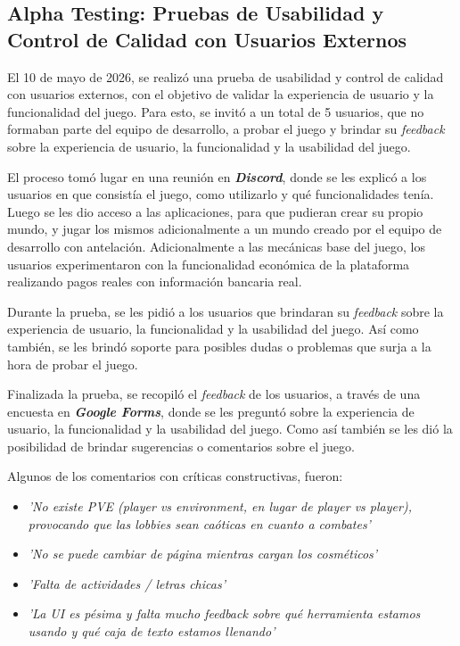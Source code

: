 \subsection{Alpha Testing: Pruebas de Usabilidad y Control de Calidad con Usuarios Externos}

El 10 de mayo de 2026, se realizó una prueba de usabilidad y control de calidad con usuarios externos, con el 
objetivo de validar la experiencia de usuario y la funcionalidad del juego. Para esto, se invitó a un total de 5 usuarios, 
que no formaban parte del equipo de desarrollo, a probar el juego y brindar su \textit{feedback} sobre la experiencia de 
usuario, la funcionalidad y la usabilidad del juego.
\vspace{0.25cm}

El proceso tomó lugar en una reunión en \textit{\textbf{Discord}}, donde se les explicó a los usuarios en que
consistía el juego, como utilizarlo y qué funcionalidades tenía. Luego se les dio acceso a las aplicaciones, para que pudieran crear su propio mundo,
y jugar los mismos adicionalmente a un mundo creado por el equipo de desarrollo con antelación.
Adicionalmente a las mecánicas base del juego, los usuarios experimentaron con la funcionalidad económica de la plataforma realizando pagos reales con
información bancaria real.
\vspace{0.25cm}

Durante la prueba, se les pidió a los usuarios que brindaran su \textit{feedback} sobre la experiencia de usuario, la 
funcionalidad y la usabilidad del juego. Así como también, se les brindó soporte para posibles dudas o problemas que surja
a la hora de probar el juego.
\vspace{0.25cm}

Finalizada la prueba, se recopiló el \textit{feedback} de los usuarios, a través de una encuesta en \textit{\textbf{Google Forms}}, 
donde se les preguntó sobre la experiencia de usuario, la funcionalidad y la usabilidad del juego. Como así también se les dió la 
posibilidad de brindar sugerencias o comentarios sobre el juego. 

\vspace{0.25cm}

Algunos de los comentarios con críticas constructivas, fueron:

\begin{itemize}
  \item \textit{'No existe PVE (\textit{player vs environment}, en lugar de \textit{player vs player}), provocando que las lobbies sean caóticas en cuanto a combates'}
  \item \textit{'No se puede cambiar de página mientras cargan los cosméticos'}
  \item \textit{'Falta de actividades / letras chicas'}
  \item \textit{'La UI es pésima y falta mucho feedback sobre qué herramienta estamos usando y qué caja de texto estamos llenando'}
\end{itemize}

